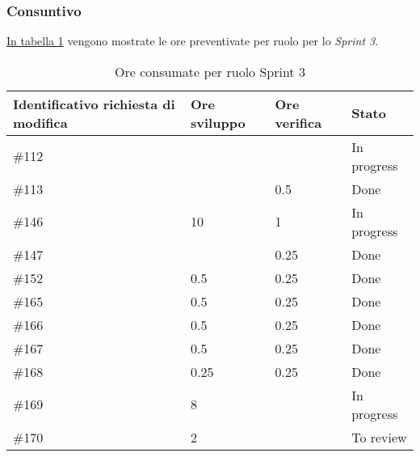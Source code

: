 \subsubsection{Consuntivo}

\hyperref[tab:sprint3_ore_consumate]{In tabella \ref{tab:sprint3_ore_consumate}} vengono mostrate le ore preventivate per ruolo per lo \textit{Sprint 3}.

\begin{table}[H]
    \centering
        \begin{tabular}{| l | l | l | l |}
            \hline
                \textbf{Identificativo richiesta di modifica} & 
                \textbf{Ore sviluppo} &
                \textbf{Ore verifica} & 
                \textbf{Stato}\\ 
    \hline
        \#112 &  & & In progress\\
    \hline
        \#113 &  & 0.5 & Done\\
    \hline
        \#146 & 10 & 1 & In progress\\
    \hline
        \#147 &  & 0.25 & Done \\
    \hline
        \#152 & 0.5 & 0.25 & Done\\
    \hline
        \#165 & 0.5 & 0.25 & Done\\
    \hline
        \#166 & 0.5 & 0.25 & Done\\
    \hline
        \#167 & 0.5 & 0.25 & Done\\
    \hline
        \#168 & 0.25 & 0.25 & Done\\
    \hline
        \#169 & 8 & & In progress\\
    \hline
        \#170 & 2 & & To review\\
    \hline
    \end{tabular}
    \caption{Ore consumate per ruolo Sprint 3}
    \label{tab:sprint3_ore_consumate} 
\end{table}